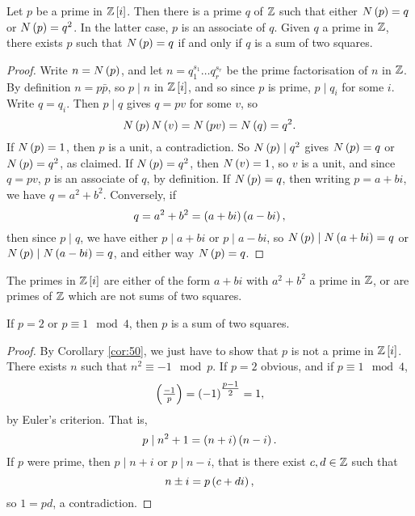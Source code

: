 
\begin{lemma}
Let $ p $ be a prime in $ \mathbb{Z}\left[ i \right] $. Then there is a prime $ q $ of $ \mathbb{Z} $ such that either $ N\left( p \right) = q $ or $ N\left( p \right) = q^2 $. In the latter case, $ p $ is an associate of $ q $. Given $ q $ a prime in $ \mathbb{Z} $, there exists $ p $ such that $ N\left( p \right) = q $ if and only if $ q $ is a sum of two squares.
\end{lemma}

\begin{proof}
Write $ n = N\left( p \right) $, and let $ n = q_1^{s_1} \dots q_r^{s_r} $ be the prime factorisation of $ n $ in $ \mathbb{Z} $. By definition $ n = p\bar{p} $, so $ p \mid n $ in $ \mathbb{Z}\left[ i \right] $, and so since $ p $ is prime, $ p \mid q_i $ for some $ i $. Write $ q = q_i $. Then $ p \mid q $ gives $ q = pv $ for some $ v $, so
$$ N\left( p \right)N\left( v \right) = N\left( pv \right) = N\left( q \right) = q^2. $$
If $ N\left( p \right) = 1 $, then $ p $ is a unit, a contradiction. So $ N\left( p \right) \mid q^2 $ gives $ N\left( p \right) = q $ or $ N\left( p \right) = q^2 $, as claimed. If $ N\left( p \right) = q^2 $, then $ N\left( v \right) = 1 $, so $ v $ is a unit, and since $ q = pv $, $ p $ is an associate of $ q $, by definition. If $ N\left( p \right) = q $, then writing $ p = a + bi $, we have $ q = a^2 + b^2 $. Conversely, if
$$ q = a^2 + b^2 = \left( a + bi \right)\left( a - bi \right), $$
then since $ p \mid q $, we have either $ p \mid a + bi $ or $ p \mid a - bi $, so $ N\left( p \right) \mid N\left( a + bi \right) = q $ or $ N\left( p \right) \mid N\left( a - bi \right) = q $, and either way $ N\left( p \right) = q $.
\end{proof}

\begin{corollary}
\label{cor:50}
The primes in $ \mathbb{Z}\left[ i \right] $ are either of the form $ a + bi $ with $ a^2 + b^2 $ a prime in $ \mathbb{Z} $, or are primes of $ \mathbb{Z} $ which are not sums of two squares.
\end{corollary}

\begin{theorem}
If $ p = 2 $ or $ p \equiv 1 \mod 4 $, then $ p $ is a sum of two squares.
\end{theorem}

\begin{proof}
By Corollary \ref{cor:50}, we just have to show that $ p $ is not a prime in $ \mathbb{Z}\left[ i \right] $. There exists $ n $ such that $ n^2 \equiv -1 \mod p $. If $ p = 2 $ obvious, and if $ p \equiv 1 \mod 4 $,
$$ \left( \tfrac{-1}{p} \right) = \left( -1 \right)^{\tfrac{p - 1}{2}} = 1, $$
by Euler's criterion. That is,
$$ p \mid n^2 + 1 = \left( n + i \right)\left( n - i \right). $$
If $ p $ were prime, then $ p \mid n + i $ or $ p \mid n - i $, that is there exist $ c, d \in \mathbb{Z} $ such that
$$ n \pm i = p\left( c + di \right), $$
so $ 1 = pd $, a contradiction.
\end{proof}

